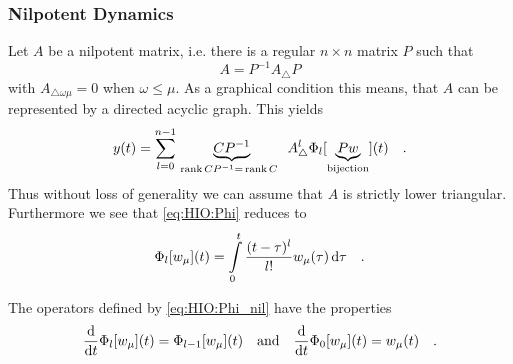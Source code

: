\subsubsection{Nilpotent Dynamics}
Let $A$ be a nilpotent matrix, i.e. there is a regular $n\times n$ matrix $P$ such that
\begin{equation}
 A = P^{-1} A_\triangle P
\end{equation}
with $A_{\triangle \omega \mu} = 0$ when $\omega \leq \mu$. As a graphical condition this 
means, that $A$ can be represented by a directed acyclic graph. This yields
\begin{equation}
y(t) = \sum\limits_{l=0}^{n-1} \underbrace{CP^{-1}}_{ \, \text{rank}\,CP^{-1} 
= \, \text{rank}\,C \,\,  \,\,  } A^l_\triangle \Phi_l[\underbrace{Pw}_\text{bijection} ](t) \quad .
\end{equation}
Thus without loss of generality we can assume that $A$ is strictly lower 
triangular. Furthermore we see that \eqref{eq:HIO:Phi} reduces to
\begin{equation}
\Phi_l[w_\mu](t) = \int\limits_0^t \frac{(t-\tau)^l}{l!} w_\mu(\tau) \, \text{d}\tau \quad .
\label{eq:HIO:Phi_nil}
\end{equation}

\begin{lemma}
The operators defined by \eqref{eq:HIO:Phi_nil} have the properties
\begin{equation}
\frac{\text{d}}{\text{d} t} \Phi_l[w_\mu](t) = \Phi_{l-1}[w_\mu](t)  
\quad \text{and} \quad \frac{\text{d}}{\text{d} t} \Phi_0[w_\mu](t) = w_\mu(t)
\quad .
\end{equation}
\end{lemma}

